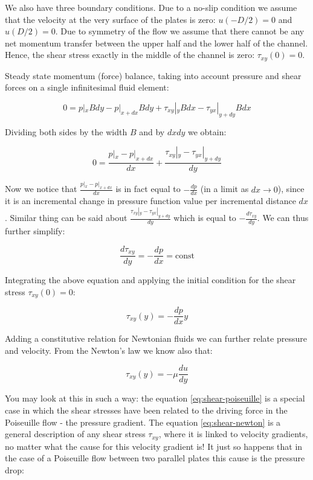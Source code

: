 \documentclass[10pt]{article}
\begin{document}
We also have three boundary conditions. Due to a no-slip condition we assume that the velocity at the very surface of the plates is zero: $u(-D/2) = 0$ and $u(D/2) = 0$. Due to symmetry of the flow we assume that there cannot be any net momentum transfer between the upper half and the lower half of the channel. Hence, the shear stress exactly in the middle of the channel is zero: $\tau_{xy}(0) = 0$.

Steady state momentum (force) balance, taking into account pressure and shear forces on a single infinitesimal fluid element:

\begin{equation}
0 = p|_x B dy - p|_{x+dx} B dy + \tau_{xy}|_y B dx - \tau_{yx}|_{y+dy} B dx
\end{equation}

Dividing both sides by the width $B$ and by $dx dy$ we obtain:

\begin{equation}
0 = \frac{p|_x  - p|_{x+dx}}{dx}  + \frac{\tau_{xy}|_y  - \tau_{yx}|_{y+dy}}{dy} 
\end{equation}

Now we notice that $\frac{p|_x  - p|_{x+dx}}{dx}$ is in fact equal to $-\frac{dp}{dx}$ (in a limit as $dx \rightarrow 0$), since it is an incremental change in pressure function value per incremental distance $dx$. Similar thing can be said about $\frac{\tau_{xy}|_y  - \tau_{yx}|_{y+dy}}{dy}$ which is equal to $-\frac{d \tau_{xy}}{dy}$. We can thus further simplify:

\begin{equation}
\frac{d \tau_{xy}}{dy} = - \frac{dp}{dx} = \text{const}
\end{equation}

Integrating the above equation and applying the initial condition for the shear stress $\tau_{xy}(0) = 0$:

\begin{equation} \label{eq:shear-poiseuille}
\tau_{xy}(y)= - \frac{dp}{dx} y
\end{equation}

Adding a constitutive relation for Newtonian fluids we can further relate pressure and velocity. From the Newton's law we know also that:

\begin{equation} \label{eq:shear-newton}
\tau_{xy}(y)= - \mu \frac{du}{dy}
\end{equation}

You may look at this in such a way: the equation \ref{eq:shear-poiseuille} is a special case in which the shear stresses have been related to the driving force in the Poiseuille flow - the pressure gradient. The equation \ref{eq:shear-newton} is a general description of any shear stress $\tau_{xy}$, where it is linked to velocity gradients, no matter what the cause for this velocity gradient is! It just so happens that in the case of a Poiseuille flow between two parallel plates this cause is the pressure drop:
\end{document}
